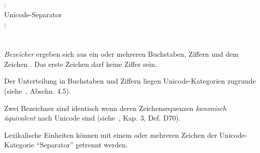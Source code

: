 \hspace*{1cm}\Gt{\_}\\
\hspace*{1cm}\Gt{\_}\Gspace{} \\
:\label{Whitespace}\\
\hspace*{1cm}Unicode-Separator\\
:\label{WS}\\
\hspace*{1cm} \\
\hspace*{1cm} \Gspace{} \\

\emph{Bezeicher} ergeben sich aus ein oder mehreren Buchstaben, Ziffern und dem Zeichen \Gt{\_}. Das erste Zeichen
darf keine Ziffer sein.

Der Unterteilung in Buchstaben und Ziffern liegen Unicode-Kategorien zugrunde (siehe~\cite{unicode}, Abschn. 4.5).

Zwei Bezeichner sind identisch wenn deren Zeichensequenzen \emph{kanonisch äquivalent} nach Unicode sind (siehe~\cite{unicode}, Kap. 3, Def. D70).

Lexikalische Einheiten können mit einem oder mehreren Zeichen der Unicode-Kategorie "`Separator"' getrennt werden.


